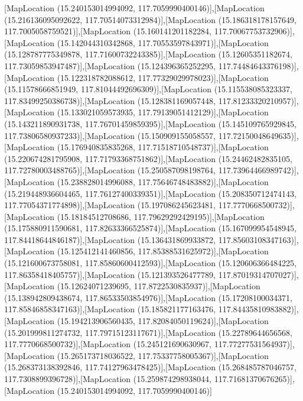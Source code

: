 [MapLocation (15.240153014994092, 117.7059990400146)],[MapLocation (15.216136095092622, 117.70514073312984)],[MapLocation (15.186318178157649, 117.7005058759521)],[MapLocation (15.160141201182284, 117.70067753732906)],[MapLocation (15.142044310342868, 117.70553597843971)],[MapLocation (15.128787775349878, 117.71600732243385)],[MapLocation (15.12605351182674, 117.73059853947487)],[MapLocation (15.124396365252295, 117.74484643376198)],[MapLocation (15.122318782088612, 117.77329029978023)],[MapLocation (15.11578666851949, 117.81044492696309)],[MapLocation (15.115538085323337, 117.83499250386738)],[MapLocation (15.128381169057448, 117.81233320210957)],[MapLocation (15.133021059573935, 117.79139051412129)],[MapLocation (15.143211890931738, 117.76701459859395)],[MapLocation (15.145109765929845, 117.73806580937233)],[MapLocation (15.150909155058557, 117.72150048649635)],[MapLocation (15.176940835835268, 117.71518710548737)],[MapLocation (15.220674281795908, 117.71793368751862)],[MapLocation (15.24462482835105, 117.72780003488765)],[MapLocation (15.250587098198764, 117.73964466989742)],[MapLocation (15.238828014996088, 117.75646748483882)],[MapLocation (15.219448936604465, 117.76127400339351)],[MapLocation (15.208350712474143, 117.77054371774898)],[MapLocation (15.197086245623481, 117.7770668500732)],[MapLocation (15.18184512708686, 117.79629292429195)],[MapLocation (15.175880911590681, 117.82633366525874)],[MapLocation (15.167099954548945, 117.84418644846187)],[MapLocation (15.136431869933872, 117.85603108347163)],[MapLocation (15.125412141460856, 117.85388531625972)],[MapLocation (15.121600673758081, 117.85860600412593)],[MapLocation (15.120606366484225, 117.86358418405757)],[MapLocation (15.121393526477789, 117.87019314707027)],[MapLocation (15.12624071239695, 117.8722530835937)],[MapLocation (15.138942809438674, 117.86533503854976)],[MapLocation (15.17208100034371, 117.85846858347163)],[MapLocation (15.185821177163476, 117.84435810983882)],[MapLocation (15.194213906560435, 117.82084050119624)],[MapLocation (15.201999811274732, 117.79715123117671)],[MapLocation (15.22789644656568, 117.7770668500732)],[MapLocation (15.245121690630967, 117.77277531564937)],[MapLocation (15.265173718036522, 117.75337758005367)],[MapLocation (15.268373138392846, 117.74127963478425)],[MapLocation (15.268485787046757, 117.7308899396728)],[MapLocation (15.259874298938044, 117.71681370676265)],[MapLocation (15.240153014994092, 117.7059990400146)]